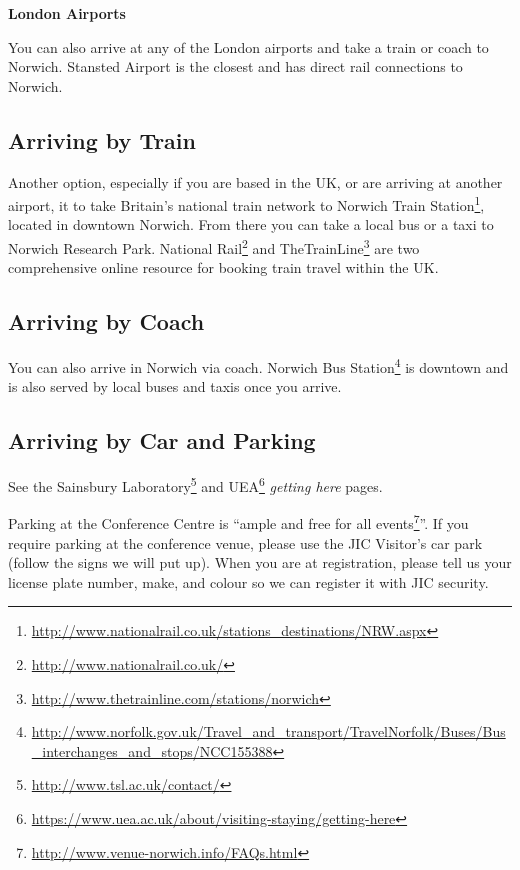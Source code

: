\documentclass[12pt,]{book}
\let\rmarkdownfootnote\footnote%
\def\footnote{\protect\rmarkdownfootnote}
\renewcommand{\href}[2]{#2\footnote{\url{#1}}}
\begin{document}
\textbf{London Airports}

You can also arrive at any of the London airports and take a train or
coach to Norwich. Stansted Airport is the closest and has direct rail
connections to Norwich.

\subsection*{Arriving by Train}\label{arriving-by-train}

Another option, especially if you are based in the UK, or are arriving
at another airport, it to take Britain's national train network to
\href{http://www.nationalrail.co.uk/stations_destinations/NRW.aspx}{Norwich
Train Station}, located in downtown Norwich. From there you can take a
local bus or a taxi to Norwich Research Park.
\href{http://www.nationalrail.co.uk/}{National Rail} and
\href{http://www.thetrainline.com/stations/norwich}{TheTrainLine} are
two comprehensive online resource for booking train travel within the
UK.

\subsection*{Arriving by Coach}\label{arriving-by-coach}

You can also arrive in Norwich via coach.
\href{http://www.norfolk.gov.uk/Travel_and_transport/TravelNorfolk/Buses/Bus_interchanges_and_stops/NCC155388}{Norwich
Bus Station} is downtown and is also served by local buses and taxis
once you arrive.

\subsection*{Arriving by Car and
Parking}\label{arriving-by-car-and-parking}

See the \href{http://www.tsl.ac.uk/contact/}{Sainsbury Laboratory} and
\href{https://www.uea.ac.uk/about/visiting-staying/getting-here}{UEA}
\emph{getting here} pages.

Parking at the Conference Centre is
``\href{http://www.venue-norwich.info/FAQs.html}{ample and free for all
events}''. If you require parking at the conference venue, please use
the JIC Visitor's car park (follow the signs we will put up). When you
are at registration, please tell us your license plate number, make, and
colour so we can register it with JIC security.
\end{document}
